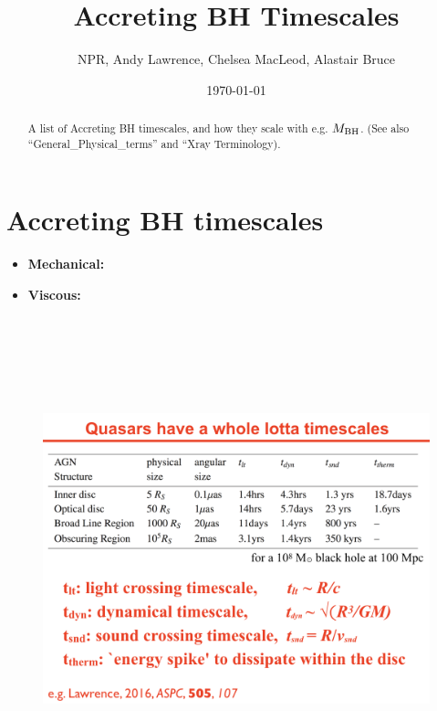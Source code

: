 \documentclass[11pt]{article}
\begin{document}
\title{Accreting BH Timescales}
\author{NPR, Andy Lawrence, Chelsea MacLeod, Alastair Bruce}
\date{\today}
\maketitle


\begin{abstract}
A list of Accreting BH timescales, and how they scale 
with e.g. $M_{\rm BH}$. 
(See also ``General\_Physical\_terms'' and ``Xray Terminology).
\end{abstract}


\section{Accreting BH timescales}

\begin{itemize}
\item{  {\bf Mechanical:} }
\item{  {\bf Viscous:} }
\end{itemize}

\citet{Croom04}
\noindent

\begin{figure}
  \centering
  \includegraphics[width=18.00cm, height=14.00cm]{Lawrence_2016plus.png}
  \caption[]{} 
  \label{}
\end{figure}
\end{document}
